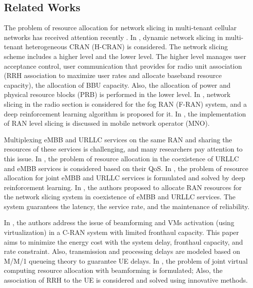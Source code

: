\documentclass[lettersize,journal]{IEEEtran}
\begin{document}
\subsection{Related Works}
The problem of resource allocation for network slicing in multi-tenant cellular networks has received attention recently \cite{feng2020dynamic,lee2018dynamic,lee2016new}.
In \cite{lee2018dynamic}, dynamic network slicing in multi-tenant heterogeneous CRAN (H-CRAN) is considered. The network slicing scheme includes a higher level and the lower level. The higher level manages user acceptance control, user communication that provides for radio unit association (RRH association to maximize user rates and allocate baseband resource capacity), the allocation of BBU capacity. Also, the allocation of power and physical resource blocks (PRB) is performed in the lower level.
In \cite{xiang2020realization}, network slicing in the radio section is considered for the fog RAN (F-RAN) system, and a deep reinforcement learning algorithm is proposed for it. In \cite{elayoubi20195g,d2020toward}, the implementation of RAN level slicing is discussed in mobile network operator (MNO).

Multiplexing eMBB and URLLC services on the same RAN and sharing the resources of these services is challenging, and many researchers pay attention to this issue.
In \cite{setayesh2020joint,yang2020should,saggese2021power}, the problem of resource allocation in the coexistence of URLLC and eMBB services is considered based on their QoS. 
In \cite{alsenwi2021intelligent}, the problem of resource allocation for joint eMBB and URLLC services is formulated and solved by deep reinforcement learning.
 In \cite{korrai2020ran}, the authors proposed to allocate RAN resources for the network slicing system in coexistence of eMBB and URLLC services. The system guarantees the latency, the service rate, and the maintenance of reliability.

In \cite{SystemCostMinimization,guo2016exploiting}, the authors address the issue of beamforming and VMs activation (using virtualization) in a C-RAN system with limited fronthaul capacity. 
This paper aims to minimize the energy cost with the system delay, fronthaul capacity, and rate constraint. 
Also, transmission and processing delays are modeled based on M/M/1 queueing theory to guarantee UE delays.
In \cite{luong2018joint,luong2018novel}, the problem of joint virtual computing resource allocation with beamforming is formulated; Also, the association of RRH to the UE is considered and solved using innovative methods.
\end{document}
